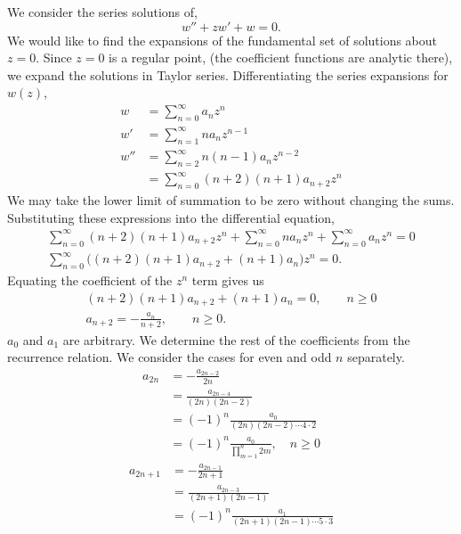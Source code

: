 {%
\begin{Solution}
  \label{solution wzww=0}
  We consider the series solutions of,
  \[ 
  w'' + z w' + w = 0. 
  \]
  We would like to find the expansions of the fundamental set of solutions
  about $z = 0$.  Since $z = 0$ is a regular point, (the coefficient functions
  are analytic there), we expand the solutions in Taylor series.
  Differentiating the series expansions for $w(z)$,
  \begin{align*}
    w       &= \sum_{n=0}^\infty a_n z^n \\
    w'      &= \sum_{n=1}^\infty n a_n z^{n-1} \\
    w''     &= \sum_{n=2}^\infty n(n-1)a_n z^{n-2} \\
    &= \sum_{n=0}^\infty (n+2)(n+1) a_{n+2} z^n
  \end{align*}
  We may take the lower limit of summation to be zero without changing 
  the sums.  Substituting these expressions into the differential equation,
  \begin{gather*}
    \sum_{n=0}^\infty (n+2)(n+1) a_{n+2} z^n + \sum_{n=0}^\infty n a_n z^{n}
    + \sum_{n=0}^\infty a_n z^n = 0 \\
    \sum_{n=0}^\infty \big( (n+2)(n+1) a_{n+2} + (n+1)a_n \big) z^n = 0 .
  \end{gather*}
  Equating the coefficient of the $z^n$ term gives us
  \begin{gather*}
    (n+2)(n+1) a_{n+2} + (n+1)a_n = 0 , \qquad n \geq 0 \\
    a_{n+2} = -\frac{a_n}{n+2}, \qquad n \geq 0.
  \end{gather*}
  $a_0$ and $a_1$ are arbitrary. 
  We determine the rest of the coefficients from the recurrence relation.
  We consider the cases for even and odd $n$ separately.
  \begin{align*}
    a_{2n}  &= -\frac{a_{2n-2}}{2n} \\
    &= \frac{a_{2n-4}}{(2n)(2n-2)} \\
    &= (-1)^n \frac{a_0}{(2n)(2n-2) \cdots 4 \cdot 2} \\
    &= (-1)^n \frac{a_0}{ \prod_{m=1}^n 2m }, \quad n \geq 0 
  \end{align*}
  \begin{align*}
    a_{2n+1} &= -\frac{a_{2n-1}}{2n+1} \\
    &= \frac{a_{2n-3}}{(2n+1)(2n-1)} \\
    &= (-1)^n \frac{a_1}{(2n+1)(2n-1)\cdots 5 \cdot 3 } \\

\end{align*}
\end{Solution}}
